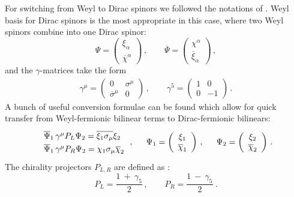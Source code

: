 \documentclass[a4paper,12pt]{article}
\begin{document}
	For switching from Weyl to Dirac spinors we followed the notations of 
\cite{Martin:1997ns}.
	Weyl basis for Dirac spinors is the most appropriate in this case,
	where two Weyl spinors combine into one Dirac spinor:
\[
	\Psi = 
		\left (
		\begin{array}{c}
	  		\xi_\alpha \\
			\overline{\chi}^{\dot\alpha}
		\end{array}
		\right )\,,
	\qquad
	\overline{\Psi} = 
		\left (
		\begin{array}{c}
	  		\chi^\alpha \\
			\overline{\xi}_{\dot\alpha}
		\end{array}
		\right )\,,
\]
	and the $ \gamma $-matrices take the form
\begin{eqnarray*}
	\gamma^\mu = 
			\left ( 
		\begin{array}{cc}
			0                    &    \sigma^\mu \\
                     \overline{\sigma}^\mu   &         0    
		\end{array}
			\right )\,,
	\qquad
	\gamma^5 = 
			\left ( 
		\begin{array}{cc}
			1      &         0  \\
                        0      &        -1    
		\end{array}
			\right )\,.
\end{eqnarray*}
	A bunch of useful conversion formulae can be found
\cite{Martin:1997ns}
	which allow for quick transfer from Weyl-fermionic
	bilinear terms to Dirac-fermionic bilinears:
\begin{equation}
	\begin{array}{ccc}
\renewcommand{\arraystretch}{1.3}
		\begin{array}{l}
		  \overline{\Psi}_1\, \gamma^\mu P_L \Psi_2 =
		    \overline{\xi_1 \sigma_\mu} \xi_2     \\
		  \overline{\Psi}_1\, \gamma^\mu P_R \Psi_2 =
		    \chi_1 \sigma_\mu \overline{\chi}_2
		\end{array}\,,   
\renewcommand{\arraystretch}{1.0}
		&
		~~
		\Psi_1 = \left (
		         \begin{array}{c}
			   \xi_1 \\
			   \overline{\chi}_1
			 \end{array}
			 \right )
		\,,
		&
		~~
		\Psi_2 = \left (
		         \begin{array}{c}
			   \xi_2 \\
			   \overline{\chi}_2
			 \end{array}
			 \right )\,.
	\end{array}
\end{equation}
	The chirality projectors $ P_{L,R} $ are defined as
\cite{Martin:1997ns}:
\[
	P_L = \frac{ 1 ~+~ \gamma_5 }
                        { 2 }\,,
	\qquad
	P_R = \frac{ 1 ~-~ \gamma_5 }
                        { 2 }~.
\]
\end{document}
